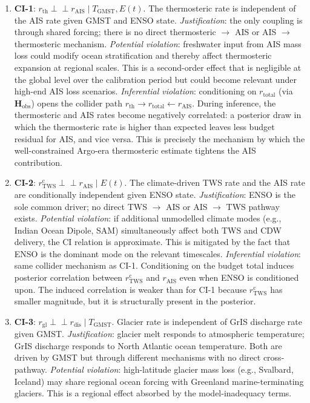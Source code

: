 \documentclass[11pt]{article}
\newcommand{\GMST}{\text{GMST}}
\begin{document}
\begin{enumerate}
  \item \textbf{CI-1}: $r_{\text{th}} \perp\!\!\!\perp r_{\text{AIS}} \mid T_{\GMST}, E(t)$.  The thermosteric rate is independent of the AIS rate given GMST and ENSO state.  \emph{Justification}: the only coupling is through shared forcing; there is no direct thermosteric $\to$ AIS or AIS $\to$ thermosteric mechanism.  \emph{Potential violation}: freshwater input from AIS mass loss could modify ocean stratification and thereby affect thermosteric expansion at regional scales.  This is a second-order effect that is negligible at the global level over the calibration period but could become relevant under high-end AIS loss scenarios.  \emph{Inferential violation}: conditioning on $r_{\text{total}}$ (via $\mathbf{H}_{\text{obs}}$) opens the collider path $r_{\text{th}} \to r_{\text{total}} \leftarrow r_{\text{AIS}}$.  During inference, the thermosteric and AIS rates become negatively correlated: a posterior draw in which the thermosteric rate is higher than expected leaves less budget residual for AIS, and vice versa.  This is precisely the mechanism by which the well-constrained Argo-era thermosteric estimate tightens the AIS contribution.

  \item \textbf{CI-2}: $r_{\text{TWS}}^{\text{c}} \perp\!\!\!\perp r_{\text{AIS}} \mid E(t)$.  The climate-driven TWS rate and the AIS rate are conditionally independent given ENSO state.  \emph{Justification}: ENSO is the sole common driver; no direct TWS $\to$ AIS or AIS $\to$ TWS pathway exists.  \emph{Potential violation}: if additional unmodelled climate modes (e.g., Indian Ocean Dipole, SAM) simultaneously affect both TWS and CDW delivery, the CI relation is approximate.  This is mitigated by the fact that ENSO is the dominant mode on the relevant timescales.  \emph{Inferential violation}: same collider mechanism as CI-1.  Conditioning on the budget total induces posterior correlation between $r_{\text{TWS}}^{\text{c}}$ and $r_{\text{AIS}}$ even when ENSO is conditioned upon.  The induced correlation is weaker than for CI-1 because $r_{\text{TWS}}^{\text{c}}$ has smaller magnitude, but it is structurally present in the posterior.

  \item \textbf{CI-3}: $r_{\text{gl}} \perp\!\!\!\perp r_{\text{dis}} \mid T_{\GMST}$.  Glacier rate is independent of GrIS discharge rate given GMST.  \emph{Justification}: glacier melt responds to atmospheric temperature; GrIS discharge responds to North Atlantic ocean temperature.  Both are driven by GMST but through different mechanisms with no direct cross-pathway.  \emph{Potential violation}: high-latitude glacier mass loss (e.g., Svalbard, Iceland) may share regional ocean forcing with Greenland marine-terminating glaciers.  This is a regional effect absorbed by the model-inadequacy terms.


\end{enumerate}
\end{document}
